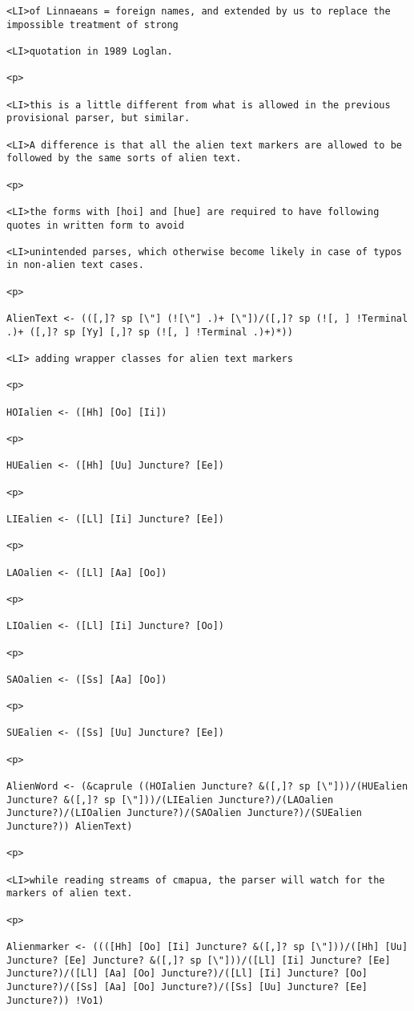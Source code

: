 \documentclass[12pt]{article}
\begin{document}
\begin{lstlisting}
<LI>of Linnaeans = foreign names, and extended by us to replace the impossible treatment of strong

<LI>quotation in 1989 Loglan.

<p>

<LI>this is a little different from what is allowed in the previous provisional parser, but similar.

<LI>A difference is that all the alien text markers are allowed to be followed by the same sorts of alien text.

<p>

<LI>the forms with [hoi] and [hue] are required to have following quotes in written form to avoid

<LI>unintended parses, which otherwise become likely in case of typos in non-alien text cases.

<p>

AlienText <- (([,]? sp [\"] (![\"] .)+ [\"])/([,]? sp (![, ] !Terminal .)+ ([,]? sp [Yy] [,]? sp (![, ] !Terminal .)+)*))

<LI> adding wrapper classes for alien text markers

<p>

HOIalien <- ([Hh] [Oo] [Ii])

<p>

HUEalien <- ([Hh] [Uu] Juncture? [Ee])

<p>

LIEalien <- ([Ll] [Ii] Juncture? [Ee])

<p>

LAOalien <- ([Ll] [Aa] [Oo])

<p>

LIOalien <- ([Ll] [Ii] Juncture? [Oo])

<p>

SAOalien <- ([Ss] [Aa] [Oo])

<p>

SUEalien <- ([Ss] [Uu] Juncture? [Ee])

<p>

AlienWord <- (&caprule ((HOIalien Juncture? &([,]? sp [\"]))/(HUEalien Juncture? &([,]? sp [\"]))/(LIEalien Juncture?)/(LAOalien Juncture?)/(LIOalien Juncture?)/(SAOalien Juncture?)/(SUEalien Juncture?)) AlienText)

<p>

<LI>while reading streams of cmapua, the parser will watch for the markers of alien text.

<p>

Alienmarker <- ((([Hh] [Oo] [Ii] Juncture? &([,]? sp [\"]))/([Hh] [Uu] Juncture? [Ee] Juncture? &([,]? sp [\"]))/([Ll] [Ii] Juncture? [Ee] Juncture?)/([Ll] [Aa] [Oo] Juncture?)/([Ll] [Ii] Juncture? [Oo] Juncture?)/([Ss] [Aa] [Oo] Juncture?)/([Ss] [Uu] Juncture? [Ee] Juncture?)) !Vo1)


\end{lstlisting}
\end{document}
